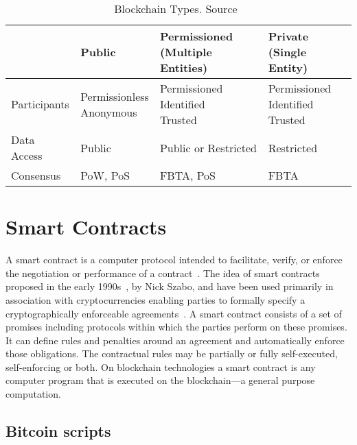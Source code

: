 \begin{table}[!ht]
  \centering
  \begin{tabular}{|l|l|l|l|}
    \hline
     & Public & \makecell[cl]{Permissioned \\ (Multiple Entities)} & \makecell[cl]{Private \\ (Single Entity)} \\ \hline
     Participants & \makecell[cl]{Permissionless \\ Anonymous} & \makecell[cl]{Permissioned \\ Identified \\ Trusted} & \makecell[cl]{Permissioned \\ Identified \\ Trusted} \\ \hline
     Data Access & Public & Public or Restricted & Restricted \\ \hline
     Consensus & PoW, PoS & FBTA, PoS & FBTA \\ \hline
  \end{tabular}
  \caption{Blockchain Types. Source~\cite{hub-bl-types}}
  \label{table:blockchain_types}
\end{table}

\section{Smart Contracts}
\label{smart_contracts}

A smart contract is a computer protocol intended to facilitate, verify, or enforce the negotiation or performance of a contract~\cite{FM548,szabo1996smart}.
The idea of smart contracts proposed in the early 1990s~\cite{FM548}, by Nick Szabo, and have been used primarily in association with cryptocurrencies enabling
parties to formally specify a cryptographically enforceable agreements~\cite{7163021}. A smart contract consists of a set of promises including protocols within which the parties perform on these promises. It can define rules and penalties around an agreement and automatically enforce those obligations. The contractual rules may be partially or fully self-executed, self-enforcing or both. On blockchain technologies a smart contract is any computer program that is executed on the blockchain---a general purpose computation.

\subsection{Bitcoin scripts}
\label{smart_contracts:bitcoin}

